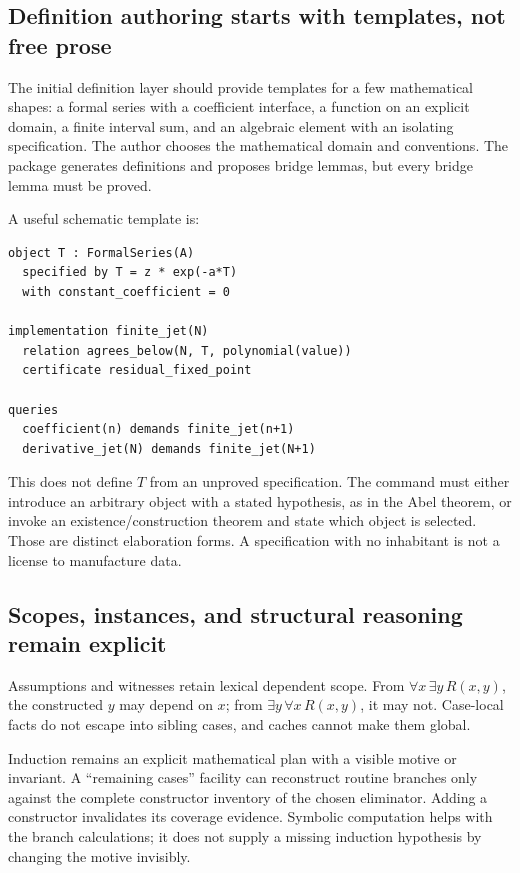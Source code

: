 \documentclass[11pt,a4paper]{article}
\theoremstyle{definition}
\begin{document}
\subsection{Definition authoring starts with templates, not free prose}
The initial definition layer should provide templates for a few mathematical shapes: a formal series with a coefficient interface, a function on an explicit domain, a finite interval sum, and an algebraic element with an isolating specification. The author chooses the mathematical domain and conventions. The package generates definitions and proposes bridge lemmas, but every bridge lemma must be proved.

A useful schematic template is:
\par\noindent\begin{minipage}{\linewidth}
\begin{lstlisting}
object T : FormalSeries(A)
  specified by T = z * exp(-a*T)
  with constant_coefficient = 0

implementation finite_jet(N)
  relation agrees_below(N, T, polynomial(value))
  certificate residual_fixed_point

queries
  coefficient(n) demands finite_jet(n+1)
  derivative_jet(N) demands finite_jet(N+1)
\end{lstlisting}
\end{minipage}\par

This does not define \(T\) from an unproved specification. The command must either introduce an arbitrary object with a stated hypothesis, as in the Abel theorem, or invoke an existence/construction theorem and state which object is selected. Those are distinct elaboration forms. A specification with no inhabitant is not a license to manufacture data.

\subsection{Scopes, instances, and structural reasoning remain explicit}
Assumptions and witnesses retain lexical dependent scope. From \(\forall x\,\exists y\,R(x,y)\), the constructed \(y\) may depend on \(x\); from \(\exists y\,\forall x\,R(x,y)\), it may not. Case-local facts do not escape into sibling cases, and caches cannot make them global.

Induction remains an explicit mathematical plan with a visible motive or invariant. A ``remaining cases'' facility can reconstruct routine branches only against the complete constructor inventory of the chosen eliminator. Adding a constructor invalidates its coverage evidence. Symbolic computation helps with the branch calculations; it does not supply a missing induction hypothesis by changing the motive invisibly.
\end{document}
